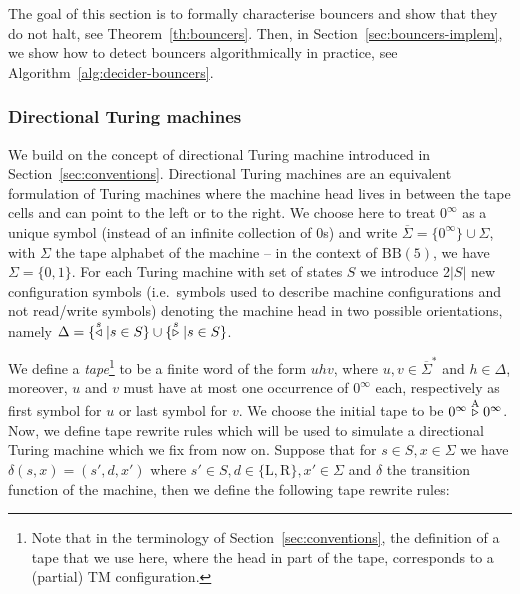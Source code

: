 The goal of this section is to formally characterise bouncers and show that they do not halt, see Theorem~\ref{th:bouncers}. Then, in Section~\ref{sec:bouncers-implem}, we show how to detect bouncers algorithmically in practice, see Algorithm~\ref{alg:decider-bouncers}.

\subsubsection{Directional Turing machines}\label{sec:bouncers:directionalTM}

We build on the concept of directional Turing machine introduced in Section~\ref{sec:conventions}. Directional Turing machines are an equivalent formulation of Turing machines where the machine head lives in between the tape cells and can point to the left or to the right. We choose here to treat $0^\infty$ as a unique symbol (instead of an infinite collection of 0s) and write $\overline{\Sigma} = \{0^\infty\}\cup\Sigma$, with $\Sigma$ the tape alphabet of the machine -- in the context of $\text{BB}(5)$, we have $\Sigma=\{0,1\}$. For each Turing machine with set of states $S$ we introduce 2$|S|$ new configuration symbols (i.e.\ symbols used to describe machine configurations and not read/write symbols) denoting the machine head in two possible orientations, namely $\Delta = \{\stackrel{s}\triangleleft | s\in S\}\cup\{\stackrel{s}\triangleright| s \in S\}$.

We define a \textit{tape}\footnote{Note that in the terminology of Section~\ref{sec:conventions}, the definition of a tape that we use here, where the head in part of the tape, corresponds to a (partial) TM configuration.} to be a finite word of the form $uhv$, where $u,v\in \overline{\Sigma}^*$ and $h\in\Delta$, moreover, $u$ and $v$ must have at most one occurrence of $0^\infty$ each, respectively as first symbol for $u$ or last symbol for $v$. We choose the initial tape to be $0^\infty \stackrel{\text{A}}\triangleright 0^\infty$. Now, we define tape rewrite rules which will be used to simulate a directional Turing machine which we fix from now on. Suppose that for $s\in S, x\in \Sigma$ we have $\delta(s,x) = (s',d,x')$ where $s'\in S, d \in \{\text{L},\text{R}\}, x' \in \Sigma$ and $\delta$ the transition function of the machine, then we define the following tape rewrite rules:


